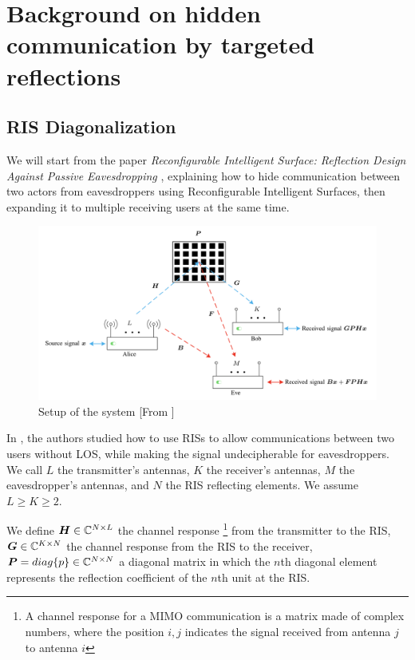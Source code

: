 \section{Background on hidden communication by targeted reflections}

\subsection{RIS Diagonalization}

We will start from the paper \textit{Reconfigurable Intelligent Surface: Reflection Design Against Passive Eavesdropping} \cite{9328149}, explaining how to hide communication between two actors from eavesdroppers using Reconfigurable Intelligent Surfaces, then expanding it to multiple receiving users at the same time.

\begin{figure}[H]
  \centering
  \includegraphics[width=\linewidth]{imgs/problem-description.png}
  \caption{Setup of the system [From \cite{9328149}]}
  \label{fig:correlation_sk}
\end{figure}

In \cite{9328149}, the authors studied how to use RISs to allow communications between two users without LOS, while making the signal undecipherable for eavesdroppers. We call $L$ the transmitter's antennas, $K$ the receiver's antennas, $M$ the eavesdropper's antennas, and $N$ the RIS reflecting elements. We assume $L \ge K \ge 2$.

We define $\bm{H} \in \mathbb{C}^{N \times L}$ the channel response \footnote{A channel response for a MIMO communication is a matrix made of complex numbers, where the position $i,j$ indicates the signal received from antenna $j$ to antenna $i$} from the transmitter to the RIS, $\bm{G} \in \mathbb{C}^{K \times N}$ the channel response from the RIS to the receiver, $\bm{P} = diag\{p\} \in \mathbb{C}^{N \times N}$ a diagonal matrix in which the $n$th diagonal element represents the reflection coefficient of the $n$th unit at the RIS.

